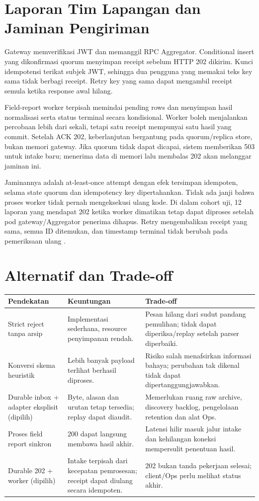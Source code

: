 \section{Laporan Tim Lapangan dan Jaminan Pengiriman}
Gateway memverifikasi JWT dan memanggil RPC Aggregator. Conditional insert yang dikonfirmasi quorum menyimpan receipt sebelum HTTP 202 dikirim. Kunci idempotensi terikat subjek JWT, sehingga dua pengguna yang memakai teks key sama tidak berbagi receipt. Retry key yang sama dapat mengambil receipt semula ketika response awal hilang.

Field-report worker terpisah memindai pending rows dan menyimpan hasil normalisasi serta status terminal secara kondisional. Worker boleh menjalankan percobaan lebih dari sekali, tetapi satu receipt mempunyai satu hasil yang commit. Setelah ACK 202, keberlanjutan bergantung pada quorum/replica store, bukan memori gateway. Jika quorum tidak dapat dicapai, sistem memberikan 503 untuk intake baru; menerima data di memori lalu membalas 202 akan melanggar jaminan ini.

Jaminannya adalah at-least-once attempt dengan efek tersimpan idempoten, selama state quorum dan idempotency key dipertahankan. Tidak ada janji bahwa proses worker tidak pernah mengeksekusi ulang kode. Di dalam cohort uji, 12 laporan yang mendapat 202 ketika worker dimatikan tetap dapat diproses setelah pod gateway/Aggregator penerima dihapus. Retry mengembalikan receipt yang sama, semua ID ditemukan, dan timestamp terminal tidak berubah pada pemeriksaan ulang .

\section{Alternatif dan Trade-off}
\begin{longtable}{@{}P{3.6cm}P{5.5cm}P{6.4cm}@{}}
\toprule Pendekatan & Keuntungan & Trade-off\\\midrule\endhead
Strict reject tanpa arsip & Implementasi sederhana, resource penyimpanan rendah. & Pesan hilang dari sudut pandang pemulihan; tidak dapat diperiksa/replay setelah parser diperbaiki.\\
Konversi skema heuristik & Lebih banyak payload terlihat berhasil diproses. & Risiko salah menafsirkan informasi bahaya; perubahan tak dikenal tidak dapat dipertanggungjawabkan.\\
Durable inbox + adapter eksplisit (dipilih) & Byte, alasan dan urutan tetap tersedia; replay dapat diaudit. & Memerlukan ruang raw archive, discovery backlog, pengelolaan retention dan alat Ops.\\
Proses field report sinkron & 200 dapat langsung membawa hasil akhir. & Latensi hilir masuk jalur intake dan kehilangan koneksi mempersulit penentuan hasil.\\
Durable 202 + worker (dipilih) & Intake terpisah dari kecepatan pemrosesan; receipt dapat diulang secara idempoten. & 202 bukan tanda pekerjaan selesai; client/Ops perlu melihat status akhir.\\\bottomrule
\end{longtable}

